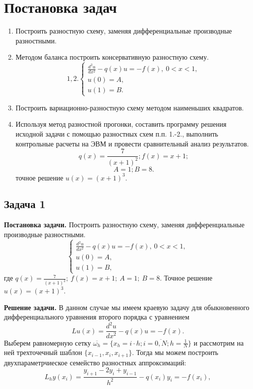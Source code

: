\documentclass[11pt]{article}
\begin{document}
    \section*{Постановка
задач}\label{ux43fux43eux441ux442ux430ux43dux43eux432ux43aux430-ux437ux430ux434ux430ux447}
\begin{enumerate}
    \item Построить разностную схему, заменяя дифференциальные производные разностными.
    \item Методом баланса построить консервативную разностную схему.
    $$1,2.\begin{cases}
        \frac{d^2u}{dx^2}-q(x)u=-f(x),\ 0<x<1,\\
        u(0)=A,\\
        u(1)=B.
    \end{cases}$$
    \item Построить вариационно-разностную схему методом наименьших квадратов.
   
    \item Используя метод разностной прогонки, составить программу решения исходной задачи с помощью разностных схем п.п. 1.-2., выполнить контрольные расчеты на ЭВМ и провести сравнительный анализ результатов.
     $$q(x)=\frac{7}{(x+1)^2}; f(x)=x+1;$$
     $$A=1;B=8.$$
     точное решение $u(x)=(x+1)^3.$
\end{enumerate}

\newpage

\subsection*{Задача 1}
\textbf{Постановка задачи.} Построить разностную схему, заменяя дифференциальные производные разностными.
    $$\begin{cases}
        \frac{d^2u}{dx^2}-q(x)u=-f(x),\ 0<x<1,\\
        u(0)=A,\\
        u(1)=B,
    \end{cases}$$
где $q(x)=\frac{7}{(x+1)^2};\ f(x)=x+1;\ A=1;\ B=8.$ Точное решение $u(x)=(x+1)^3.$
     
\textbf{Решение задачи.} В данном случае мы имеем краевую задачу для обыкновенного дифференциального уравнения второго порядка с уравнением
$$Lu(x)=\frac{d^2u}{dx^2}-q(x)u=-f(x).$$
Выберем равномерную сетку $\overline{\omega_h}=\{x_h=i\cdot h; i=\overline{0,N};h=\frac{1}{N}\}$ и рассмотрим на ней трехточечный шаблон $\{x_{i-1},x_i,x_{i+1} \}$. Тогда мы можем построить двухпараметрчиеское семейство разностных аппроксимаций:
$$L_hy(x_i)=\frac{y_{i+1}-2y_i+y_{i-1}}{h^2}-q(x_i)y_i=-f(x_i),$$
\end{document}
